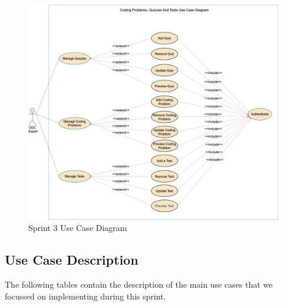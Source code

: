 \begin{figure}
  \centering
  \includegraphics[width=1\textwidth, height=0.9\textheight]{images/usecaseSprint2.png}
  \caption{Sprint 3 Use Case Diagram}\label{fig: Sprint 3 Use Case Diagram}
\end{figure}

\newpage

\subsection{Use Case Description}
The following tables contain the description of the main use cases that we focussed on implementing during this sprint.

